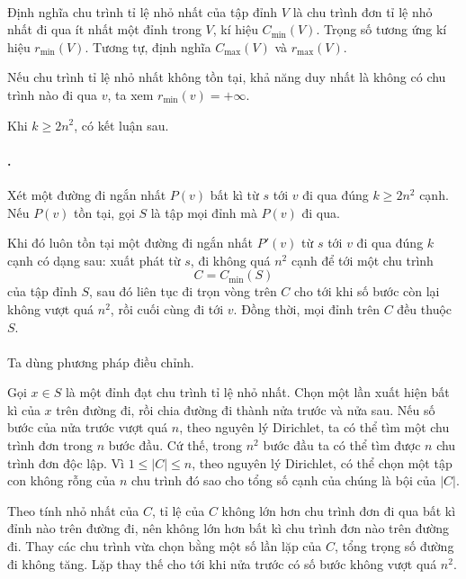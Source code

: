 \documentclass[11pt]{article}
\begin{document}
\paragraph{}
Định nghĩa chu trình tỉ lệ nhỏ nhất của tập đỉnh \(V\) là chu trình đơn tỉ lệ
nhỏ nhất đi qua ít nhất một đỉnh trong \(V\), kí hiệu \(C_{\min}(V)\). Trọng số
tương ứng kí hiệu \(r_{\min}(V)\). Tương tự, định nghĩa \(C_{\max}(V)\) và
\(r_{\max}(V)\).

Nếu chu trình tỉ lệ nhỏ nhất không tồn tại, khả năng duy nhất là không có chu
trình nào đi qua \(v\), ta xem \(r_{\min}(v)=+\infty\).

Khi \(k\ge2n^2\), có kết luận sau.

\paragraph{.}
Xét một đường đi ngắn nhất \(P(v)\) bất kì từ \(s\) tới \(v\) đi qua đúng
\(k\ge2n^2\) cạnh. Nếu \(P(v)\) tồn tại, gọi \(S\) là tập mọi đỉnh mà \(P(v)\)
đi qua.

Khi đó luôn tồn tại một đường đi ngắn nhất \(P'(v)\) từ \(s\) tới \(v\) đi qua
đúng \(k\) cạnh có dạng sau: xuất phát từ \(s\), đi không quá \(n^2\) cạnh để
tới một chu trình
\[
  C=C_{\min}(S)
\]
của tập đỉnh \(S\), sau đó liên tục đi trọn vòng trên \(C\) cho tới khi số bước
còn lại không vượt quá \(n^2\), rồi cuối cùng đi tới \(v\). Đồng thời, mọi đỉnh
trên \(C\) đều thuộc \(S\).

\paragraph{}
Ta dùng phương pháp điều chỉnh.

Gọi \(x\in S\) là một đỉnh đạt chu trình tỉ lệ nhỏ nhất. Chọn một lần xuất
hiện bất kì của \(x\) trên đường đi, rồi chia đường đi thành nửa trước và nửa
sau. Nếu số bước của nửa trước vượt quá \(n\), theo nguyên lý Dirichlet, ta có
thể tìm một chu trình đơn trong \(n\) bước đầu. Cứ thế, trong \(n^2\) bước đầu
ta có thể tìm được \(n\) chu trình đơn độc lập. Vì \(1\le |C|\le n\), theo
nguyên lý Dirichlet, có thể chọn một tập con không rỗng của \(n\) chu trình đó
sao cho tổng số cạnh của chúng là bội của \(|C|\).

Theo tính nhỏ nhất của \(C\), tỉ lệ của \(C\) không lớn hơn chu trình đơn đi
qua bất kì đỉnh nào trên đường đi, nên không lớn hơn bất kì chu trình đơn nào
trên đường đi. Thay các chu trình vừa chọn bằng một số lần lặp của \(C\), tổng
trọng số đường đi không tăng. Lặp thay thế cho tới khi nửa trước có số bước
không vượt quá \(n^2\).
\end{document}
